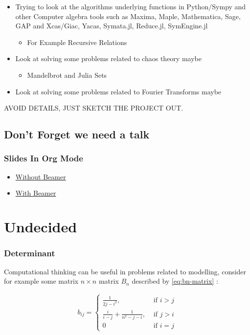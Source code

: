 \documentclass[11pt]{article}
\begin{document}
\begin{itemize}
\item Trying to look at the algorithms underlying functions in Python/Sympy and other Computer algebra tools such as Maxima, Maple, Mathematica, Sage, GAP and Xcas/Giac, Yacas, Symata.jl, Reduce.jl, SymEngine.jl
\begin{itemize}
\item For Example Recursive Relations
\end{itemize}
\item Look at solving some problems related to chaos theory maybe
\begin{itemize}
\item Mandelbrot and Julia Sets
\end{itemize}
\item Look at solving some problems related to Fourier Transforms maybe
\end{itemize}


AVOID DETAILS, JUST SKETCH THE PROJECT OUT.

\subsection{Don't Forget we need a talk}
\label{sec:orgc5d0e88}
\subsubsection{Slides In Org Mode}
\label{sec:orgad64333}
\begin{itemize}
\item \href{https://orgmode.org/worg/org-tutorials/non-beamer-presentations.html}{Without Beamer}
\item \href{https://orgmode.org/worg/exporters/beamer/tutorial.html}{With Beamer}
\end{itemize}
\section{Undecided}
\label{sec:orgcfd7bd8}
\subsubsection{Determinant}
\label{sec:orga6dab17}
Computational thinking can be useful in problems related to modelling, consider
for example some matrix \(n\times n\) matrix \(B_n\) described by \eqref{eq:bn-matrix} :

\begin{align}
b_{ij} = \begin{cases}
\frac{1}{2j- i^2}, &\text{ if } i > j \\
\frac{i}{i- j}+  \frac{1}{n^2- j - i}, &\text{ if } j>i \\
0 &\text{ if } i = j
\end{cases} \label{eq:bn-matrix}
\end{align}
\end{document}
